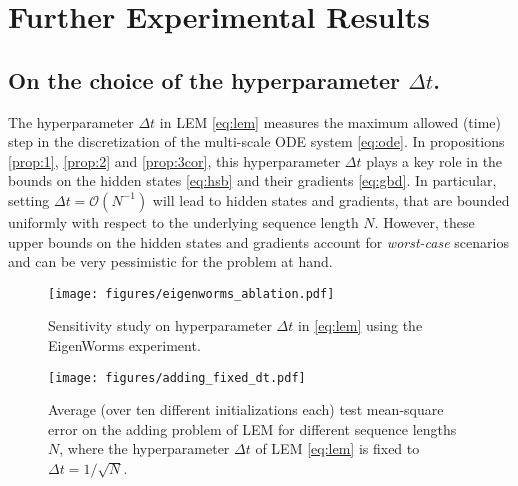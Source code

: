 \documentclass{article} \usepackage{iclr2022_conference,times}
\newcommand{\ord}{{\mathcal O}}
\newcommand{\Dt}{{\Delta t}}
\begin{document}
\section{Further Experimental Results}
\label{app:fer}
\subsection{On the choice of the hyperparameter $\Dt$.}
\label{app:dt}
The hyperparameter $\Dt$ in LEM \eqref{eq:lem} measures the maximum allowed (time) step in the discretization of the multi-scale ODE system \eqref{eq:ode}. In propositions \ref{prop:1}, \ref{prop:2} and \ref{prop:3cor}, this hyperparameter $\Dt$ plays a key role in the bounds on the hidden states \eqref{eq:hsb} and their gradients \eqref{eq:gbd}. In particular, setting $\Dt = \ord(N^{-1})$ will lead to hidden states and gradients, that are bounded uniformly with respect to the underlying sequence length $N$. However, these upper bounds on the hidden states and gradients account for \emph{worst-case} scenarios and can be very pessimistic for the problem at hand.

\begin{figure}[ht!]
\centering
\begin{minipage}[t]{.48\textwidth}
\texttt{[image: figures/eigenworms\_ablation.pdf]}
\caption{Sensitivity study on hyperparameter $\Dt$ in \eqref{eq:lem} using the EigenWorms experiment.}
\label{fig:eworms_abl}
\end{minipage}
\hspace{0.0025\textwidth}
\begin{minipage}[t]{.48\textwidth}
\texttt{[image: figures/adding\_fixed\_dt.pdf]}
\caption{Average (over ten different initializations each) test mean-square error on the adding problem of LEM for different sequence lengths $N$, where the hyperparameter $\Dt$ of LEM \eqref{eq:lem} is fixed to $\Dt=1/\sqrt{N}$.}
\label{fig:adding_fixed_dt}
\end{minipage}
\end{figure}
\end{document}
